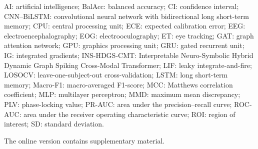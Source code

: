 \backmatter

AI: artificial intelligence; BalAcc: balanced accuracy; CI: confidence interval; CNN--BiLSTM: convolutional neural network with bidirectional long short-term memory; CPU: central processing unit; ECE: expected calibration error; EEG: electroencephalography; EOG: electrooculography; ET: eye tracking; GAT: graph attention network; GPU: graphics processing unit; GRU: gated recurrent unit; IG: integrated gradients; INS-HDGS-CMT: Interpretable Neuro-Symbolic Hybrid Dynamic Graph Spiking Cross-Modal Transformer; LIF: leaky integrate-and-fire; LOSOCV: leave-one-subject-out cross-validation; LSTM: long short-term memory; Macro-F1: macro-averaged F1-score; MCC: Matthews correlation coefficient; MLP: multilayer perceptron; MMD: maximum mean discrepancy; PLV: phase-locking value; PR-AUC: area under the precision--recall curve; ROC-AUC: area under the receiver operating characteristic curve; ROI: region of interest; SD: standard deviation.

The online version contains supplementary material.

